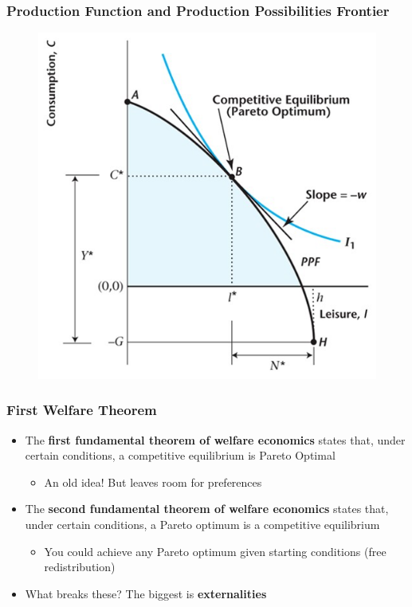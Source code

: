 \documentclass{beamer}
\begin{document}
\begin{frame}
\frametitle[alignment=center]{Production Function and Production Possibilities Frontier}
\begin{figure}
\centering
\includegraphics[scale=0.5]{Figures/W_Fig_5pt4.png}
\end{figure}
\end{frame}

\begin{frame}
\frametitle[alignment=center]{First Welfare Theorem}
\begin{itemize}
\item The \textbf{first fundamental  theorem of welfare economics} states that, under certain conditions, a competitive equilibrium is Pareto Optimal
\begin{itemize}
\item An old idea!  But leaves room for preferences
\end{itemize} 
\bigskip
\item The \textbf{second fundamental  theorem of welfare economics} states that, under certain conditions, a Pareto optimum is a competitive equilibrium
\begin{itemize}
\item You could achieve any Pareto optimum given starting conditions (free redistribution)
\end{itemize}
\item What breaks these?  The biggest is \textbf{externalities}
\end{itemize}
\end{frame}
\end{document}
